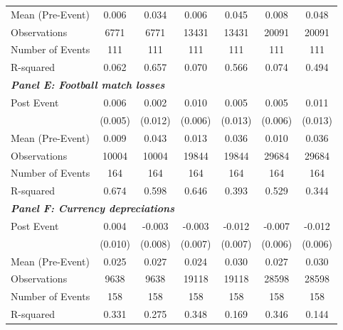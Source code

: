{\begin{tabular}{l*{6}{c}}
\midrule
Mean (Pre-Event)&       0.006         &       0.034         &       0.006         &       0.045         &       0.008         &       0.048         \\
Observations&        6771         &        6771         &       13431         &       13431         &       20091         &       20091         \\
Number of Events&         111         &         111         &         111         &         111         &         111         &         111         \\
R-squared   &       0.062         &       0.657         &       0.070         &       0.566         &       0.074         &       0.494         \\
\bottomrule
\multicolumn{7}{l}{\textbf{\textit{Panel E: Football match losses}}} \\
Post Event  &       0.006         &       0.002         &       0.010         &       0.005         &       0.005         &       0.011         \\
&     (0.005)         &     (0.012)         &     (0.006)         &     (0.013)         &     (0.006)         &     (0.013)         \\
\midrule
Mean (Pre-Event)&       0.009         &       0.043         &       0.013         &       0.036         &       0.010         &       0.036         \\
Observations&       10004         &       10004         &       19844         &       19844         &       29684         &       29684         \\
Number of Events&         164         &         164         &         164         &         164         &         164         &         164         \\
R-squared   &       0.674         &       0.598         &       0.646         &       0.393         &       0.529         &       0.344         \\
\bottomrule
\multicolumn{7}{l}{\textbf{\textit{Panel F: Currency depreciations}}} \\
Post Event  &       0.004         &      -0.003         &      -0.003         &      -0.012\sym{*}  &      -0.007         &      -0.012\sym{*}  \\
&     (0.010)         &     (0.008)         &     (0.007)         &     (0.007)         &     (0.006)         &     (0.006)         \\
\midrule
Mean (Pre-Event)&       0.025         &       0.027         &       0.024         &       0.030         &       0.027         &       0.030         \\
Observations&        9638         &        9638         &       19118         &       19118         &       28598         &       28598         \\
Number of Events&         158         &         158         &         158         &         158         &         158         &         158         \\
R-squared   &       0.331         &       0.275         &       0.348         &       0.169         &       0.346         &       0.144         \\
\bottomrule
\end{tabular}
}
